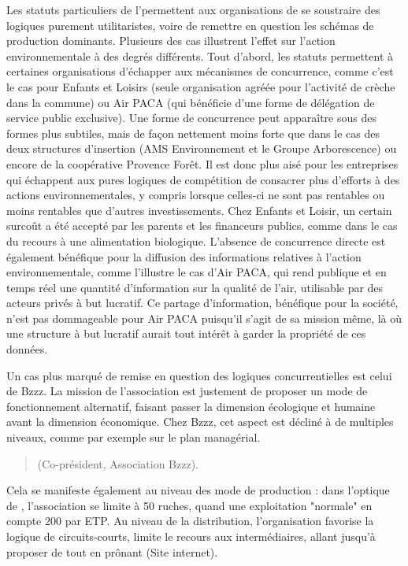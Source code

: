         Les statuts particuliers de l'\ess permettent aux organisations de se soustraire des logiques purement utilitaristes, voire de remettre en question les schémas de production dominants. Plusieurs des cas illustrent l'effet sur l'action environnementale à des degrés différents. Tout d'abord, les statuts permettent à certaines organisations d'échapper aux mécanismes de concurrence, comme c'est le cas pour Enfants et Loisirs (seule organisation agréée pour l'activité de crèche dans la commune) ou Air PACA (qui bénéficie d'une forme de délégation de service public exclusive). Une forme de concurrence peut apparaître sous des formes plus subtiles, mais de façon nettement moins forte que dans le cas des deux structures d'insertion (AMS Environnement et le Groupe Arborescence) ou encore de la coopérative Provence Forêt. Il est donc plus aisé pour les entreprises qui échappent aux pures logiques de compétition de consacrer plus d'efforts à des actions environnementales, y compris lorsque celles-ci ne sont pas rentables ou moins rentables que d'autres investissements. Chez Enfants et Loisir, un certain surcoût a été accepté par les parents et les financeurs publics, comme dans le cas du recours à une alimentation biologique. L'absence de concurrence directe est également bénéfique pour la diffusion des informations relatives à l'action environnementale, comme l'illustre le cas d'Air PACA, qui rend publique et en temps réel une quantité d'information sur la qualité de l'air, utilisable par des acteurs privés à but lucratif. Ce partage d'information, bénéfique pour la société, n'est pas dommageable pour Air PACA puisqu'il s'agit de sa mission même, là où une structure à but lucratif aurait tout intérêt à garder la propriété de ces données.

        Un cas plus marqué de remise en question des logiques concurrentielles est celui de Bzzz. La mission de l'association est justement de proposer un mode de fonctionnement alternatif, faisant passer la dimension écologique et humaine avant la dimension économique. Chez Bzzz, cet aspect est décliné à de multiples niveaux, comme par exemple sur le plan managérial.
        \begin{quotation}
              (Co-président, Association Bzzz).
        \end{quotation}
        Cela se manifeste également au niveau des mode de production : dans l'optique de , l'association se limite à 50 ruches, quand une exploitation "normale" en compte 200 par ETP.
        Au niveau de la distribution, l'organisation favorise la logique de circuits-courts, limite le recours aux intermédiaires, allant jusqu'à proposer de  tout en prônant  (Site internet).

